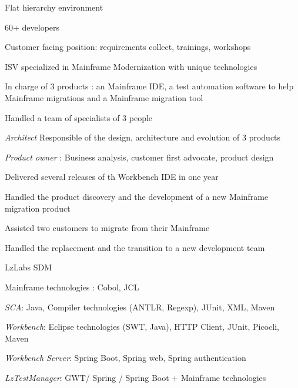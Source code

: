 \begin{cventries}
{{\begin{cvitems}
                    \item{Flat hierarchy environment}
                    \item{60+ developers}
                    \item{Customer facing position: requirements collect, trainings, workshops }
                    \item{ISV specialized in Mainframe Modernization with unique technologies}
                    \item{In charge of 3 products : an Mainframe IDE, a test automation software to help Mainframe migrations and a Mainframe migration tool }
                    \item{Handled a team of specialists of 3 people}
                    \item {\emph{Architect} Responsible of the design, architecture and evolution of 3 products }
                    \item {\emph{Product owner} : Business analysis, customer first advocate, product design }
                    \end{cvitems}
            }
            {
               \begin{cvitems} %
                \item {Delivered several releases of th Workbench IDE in one year }
                \item {Handled the product discovery and the development of a new Mainframe migration product }
                \item {Assisted two customers to migrate from their Mainframe }
                \item {Handled the replacement and the transition to a new development team}
               \end{cvitems}
            }
            {
                \begin{cvitems} %
                    \item{LzLabs SDM}
                    \item{Mainframe technologies : Cobol, JCL}
                    \item{\emph{SCA}: Java, Compiler technologies (ANTLR, Regexp), JUnit, XML, Maven}
                    \item{\emph{Workbench}: Eclipse technologies (SWT, Java), HTTP Client, JUnit, Picocli, Maven}
                    \item{\emph{Workbench Server}: Spring Boot, Spring web, Spring authentication}
                    \item{\emph{LzTestManager}: GWT/ Spring / Spring Boot + Mainframe technologies}
                \end{cvitems}
            }            
    }


\end{cventries}

